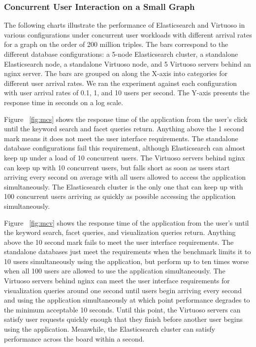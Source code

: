 \subsubsection{Concurrent User Interaction on a Small Graph} 
The following charts illustrate the performance of Elasticsearch and Virtuoso in various configurations under concurrent user workloads with different arrival rates for a graph on the order of 200 million triples.
The bars correspond to the different database configurations: a 5-node Elasticsearch cluster, a standalone Elasticsearch node, a standalone Virtuoso node, and 5 Virtuoso servers behind an nginx server.  
The bars are grouped on along the X-axis into categories for different user arrival rates.
We ran the experiment against each configuration with user arrival rates of 0.1, 1, and 10 users per second.
The Y-axis presents the response time in seconds on a log scale.  

Figure ~\ref{fig:mcs} shows the response time of the application from the user's click until the keyword search and facet queries return.  Anything above the 1 second mark means it does not meet the user interface requirements.  
The standalone database configurations fail this requirement, although Elasticsearch can almost keep up under a load of 10 concurrent users.
The Virtuoso servers behind nginx can keep up with 10 concurrent users, but falls short as soon as users start arriving every second on average with all users allowed to access the application simultaneously.
The Elasticsearch cluster is the only one that can keep up with 100 concurrent users arriving as quickly as possible accessing the application simultaneously.

Figure ~\ref{fig:mcv} shows the response time of the application from the user's until the keyword search, facet queries, and visualization queries return.  Anything above the 10 second mark fails to meet the user interface requirements.
The standalone databases just meet the requirements when the benchmark limits it to 10 users simultaneously using the application, but perform up to ten times worse when all 100 users are allowed to use the application simultaneously.
The Virtuoso servers behind nginx can meet the user interface requirements for visualization queries around one second until users begin arriving every second and using the application simultaneously at which point performance degrades to the minimum acceptable 10 seconds.
Until this point, the Virtuoso servers can satisfy user requests quickly enough that they finish before another user begins using the application. 
Meanwhile, the Elasticsearch cluster can satisfy performance across the board within a second.  

